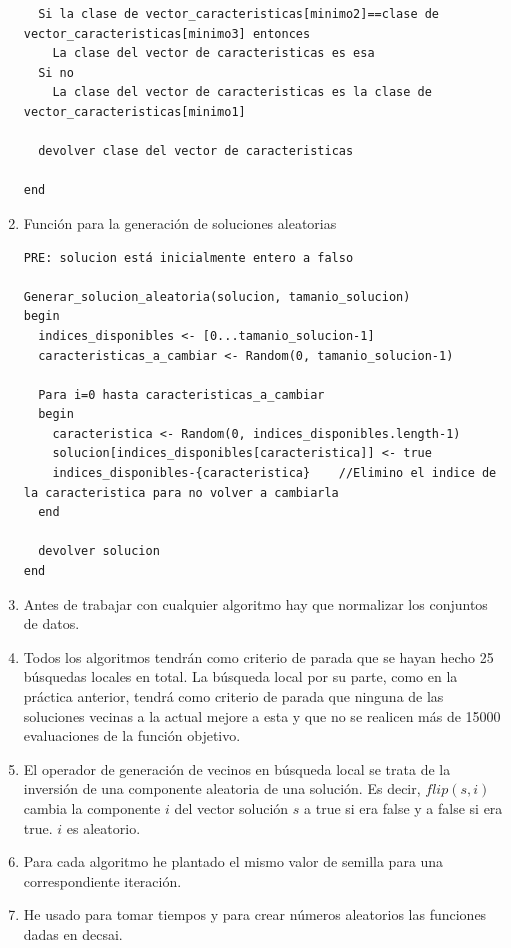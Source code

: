 \begin{enumerate}
\begin{lstlisting}
  Si la clase de vector_caracteristicas[minimo2]==clase de vector_caracteristicas[minimo3] entonces
    La clase del vector de caracteristicas es esa
  Si no
    La clase del vector de caracteristicas es la clase de vector_caracteristicas[minimo1]
    
  devolver clase del vector de caracteristicas
  
end
		\end{lstlisting}
		
		\item Función para la generación de soluciones aleatorias
\begin{lstlisting}
PRE: solucion está inicialmente entero a falso

Generar_solucion_aleatoria(solucion, tamanio_solucion)
begin
  indices_disponibles <- [0...tamanio_solucion-1]
  caracteristicas_a_cambiar <- Random(0, tamanio_solucion-1)
  
  Para i=0 hasta caracteristicas_a_cambiar
  begin
    caracteristica <- Random(0, indices_disponibles.length-1)
    solucion[indices_disponibles[caracteristica]] <- true
    indices_disponibles-{caracteristica}    //Elimino el indice de la caracteristica para no volver a cambiarla
  end
  
  devolver solucion
end

\end{lstlisting}
		
		\item Antes de trabajar con cualquier algoritmo hay que normalizar los conjuntos de datos.
		
		\item Todos los algoritmos tendrán como criterio de parada que se hayan hecho 25 búsquedas locales en total. La búsqueda local por su parte, como en la práctica anterior, tendrá como criterio de parada que ninguna de las soluciones vecinas a la actual mejore a esta y que no se realicen más de 15000 evaluaciones de la función objetivo.
		
		\item El operador de generación de vecinos en búsqueda local se trata de la inversión de una componente aleatoria de una solución. Es decir, $flip(s,i)$ cambia la componente $i$ del vector solución $s$ a true si era false y a false si era true. $i$ es aleatorio.
		
		
		\item Para cada algoritmo he plantado el mismo valor de semilla para una correspondiente iteración.
		
		\item He usado para tomar tiempos y para crear números aleatorios las funciones dadas en decsai.
	\end{enumerate}
	
